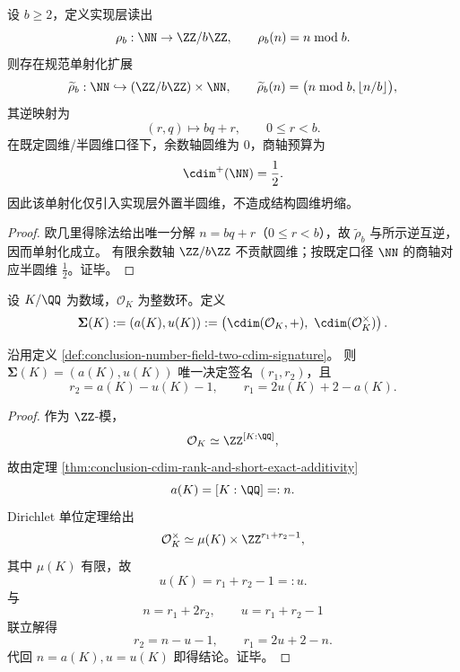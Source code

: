 \begin{proposition}[模读出的实现层外置轴预算]\label{prop:conclusion-mod-readout-external-half-circle-budget}
设 \(b\ge 2\)，定义实现层读出
\[
\rho_b:\NN\to \ZZ/b\ZZ,\qquad \rho_b(n)=n\bmod b.
\]
则存在规范单射化扩展
\[
\widetilde\rho_b:\NN\hookrightarrow (\ZZ/b\ZZ)\times\NN,\qquad
\widetilde\rho_b(n)=\bigl(n\bmod b,\lfloor n/b\rfloor\bigr),
\]
其逆映射为
\[
(r,q)\longmapsto bq+r,\qquad 0\le r<b.
\]
在既定圆维/半圆维口径下，余数轴圆维为 \(0\)，商轴预算为
\[
\cdim^+(\NN)=\frac12.
\]
因此该单射化仅引入实现层外置半圆维，不造成结构圆维坍缩。
\end{proposition}
\begin{proof}
欧几里得除法给出唯一分解 \(n=bq+r\)（\(0\le r<b\)），故 \(\widetilde\rho_b\) 与所示逆互逆，因而单射化成立。
有限余数轴 \(\ZZ/b\ZZ\) 不贡献圆维；按既定口径 \(\NN\) 的商轴对应半圆维 \(\frac12\)。证毕。
\end{proof}

\begin{definition}[数域的二元圆维签名]\label{def:conclusion-number-field-two-cdim-signature}
设 \(K/\QQ\) 为数域，\(\mathcal O_K\) 为整数环。定义
\[
\mathbf\Sigma(K):=(a(K),u(K))
:=
\left(\cdim(\mathcal O_K,+),\ \cdim(\mathcal O_K^\times)\right).
\]
\end{definition}

\begin{theorem}[数域两类圆维决定阿基米德签名]\label{thm:conclusion-number-field-signature-from-two-cdims}
沿用定义 \ref{def:conclusion-number-field-two-cdim-signature}。
则 \(\mathbf\Sigma(K)=(a(K),u(K))\) 唯一决定签名 \((r_1,r_2)\)，且
\[
r_2=a(K)-u(K)-1,\qquad
r_1=2u(K)+2-a(K).
\]
\end{theorem}
\begin{proof}
作为 \(\ZZ\)-模，
\[
\mathcal O_K\simeq \ZZ^{[K:\QQ]},
\]
故由定理 \ref{thm:conclusion-cdim-rank-and-short-exact-additivity}
\[
a(K)=[K:\QQ]=:n.
\]
Dirichlet 单位定理给出
\[
\mathcal O_K^\times\simeq \mu(K)\times \ZZ^{r_1+r_2-1},
\]
其中 \(\mu(K)\) 有限，故
\[
u(K)=r_1+r_2-1=:u.
\]
与
\[
n=r_1+2r_2,\qquad u=r_1+r_2-1
\]
联立解得
\[
r_2=n-u-1,\qquad r_1=2u+2-n.
\]
代回 \(n=a(K),u=u(K)\) 即得结论。证毕。
\end{proof}


